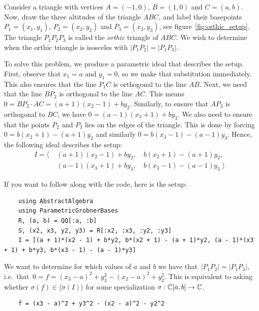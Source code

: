 \begin{example} \upshape
  Consider a triangle with vertices $A = (-1, 0)$, $B = (1, 0)$ and $C = (a, b)$. Now, draw the three altitudes of the triangle $ABC$, and label their basepoints $P_{1} = (x_{1}, y_{1})$, $P_{2} = (x_{2}, y_{2})$ and $P_{3} = (x_{3}, y_{3})$, see figure~\ref{fig:orthic_setup}. The triangle $P_{1}P_{2}P_{3}$ is called the \textit{orthic} triangle of $ABC$. We wish to determine when the orthic triangle is isosceles with $|P_{1}P_{2}| = |P_{1}P_{3}|$.

  To solve this problem, we produce a parametric ideal that describes the setup. First, observe that $x_{1} = a$ and $y_{1} = 0$, so we make that substitution immediately. This also ensures that the line $P_{1}C$ is orthogonal to the line $AB$. Next, we need that the line $BP_{2}$ is orthogonal to the line $AC$. This means $0 = BP_{2} \cdot AC = (a + 1)(x_{2} - 1) + b y_{2}$. Similarly, to ensure that $AP_{3}$ is orthogonal to $BC$, we have $0 = (a - 1)(x_{3} + 1) + b y_{3}$. We also need to ensure that the points $P_{2}$ and $P_{3}$ lies on the edges of the triangle. This is done by forcing $0 = b(x_{2} + 1) - (a + 1)y_{2}$ and similarly $0 = b(x_{3} - 1) - (a - 1)y_{3}$. Hence, the following ideal describes the setup:
  \begin{align*}
    I = \langle\; &(a + 1)(x_{2} - 1) + b y_{2}, \quad  b(x_{2} + 1) - (a + 1)y_{2}, \\
                  &(a - 1)(x_{3} + 1) + b y_{3}, \quad  b(x_{3} - 1) - (a - 1)y_{3} \; \rangle
  \end{align*}

  If you want to follow along with the code, here is the setup:
  \begin{verbatim}
    using AbstractAlgebra
    using ParametricGrobnerBases
    R, (a, b) = QQ[:a, :b]
    S, (x2, x3, y2, y3) = R[:x2, :x3, :y2, :y3]
    I = [(a + 1)*(x2 - 1) + b*y2, b*(x2 + 1) - (a + 1)*y2, (a - 1)*(x3 + 1) + b*y3, b*(x3 - 1) - (a - 1)*y3]
  \end{verbatim}

  We want to determine for which values of $a$ and $b$ we have that $\,|P_{1} P_{2}| = |P_{1} P_{3}|$, i.e.\ that $\,0 = f = (x_{3} - a)^{2} + y_{3}^{2} - (x_{2} - a)^{2} + y_{2}^{2}$. This is equivalent to asking whether $\sigma(f) \in \langle \sigma(I) \rangle$ for some specialization $\sigma : \mathbb{C}[a, b] \to \mathbb{C}$.

  \begin{verbatim}
    f = (x3 - a)^2 + y3^2 - (x2 - a)^2 - y2^2
  \end{verbatim}



\end{example}
